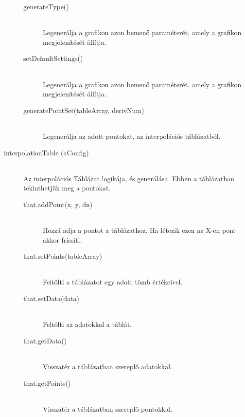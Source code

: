 \begin{description}
\begin{description}
			\item[generateType()]
			\hfill \\ Legenerálja a grafikon azon bemenő paraméterét, amely a grafikon megjelenítését állítja.
			\item[setDefaultSettings()]
			\hfill \\ Legenerálja a grafikon azon bemenő paraméterét, amely a grafikon megjelenítését állítja.
			\item[generatePointSet(tableArray, derivNum)]
			\hfill \\ Legenerálja az adott pontokat, az interpolációs táblázatból.
			\end{description}

		\item[interpolationTable (aConfig)]
			\hfill \\ 
				Az interpolációs Táblázat logikája, és generálása. Ebben a táblázatban tekinthetjük meg a pontokat.
			\begin{description}
			\item[that.addPoint(x, y, dn)] 
			\hfill \\ Hozzá adja a pontot a táblázathoz. Ha létezik ezen az X-en pont akkor frissíti.
			\item[that.setPoints(tableArray)] 
			\hfill \\ Feltölti a táblázatot egy adott tömb értékeivel.
			\item[that.setData(data)] 
			\hfill \\ Feltölti az adatokkal a táblát.
			\item[that.getData()] 
			\hfill \\ Visszatér a táblázatban szereplő adatokkal.
			\item[that.getPoints()] 
			\hfill \\ Visszatér a táblázatban szereplő pontokkal.
			\end{description}
	\end{description}